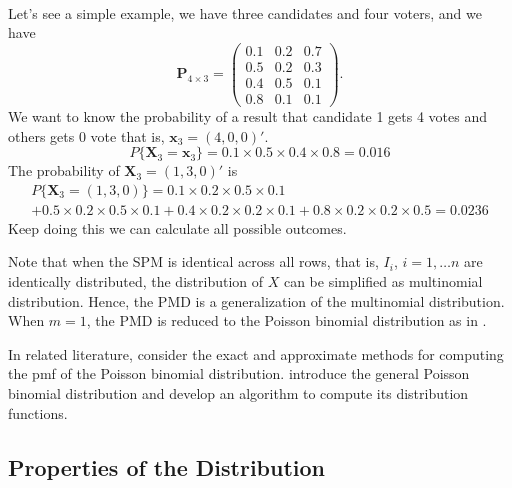 \documentclass[12pt]{article}
\newcommand{\Pmat}{\mathbf{P}}
\newcommand{\Xvec}{\boldsymbol{X}}
\newcommand{\xvec}{\boldsymbol{x}}
\begin{document}
\\
Let's see a simple example, we have three candidates and four voters, and we have
\begin{equation*}
\Pmat_{4 \times 3} = \begin{pmatrix}
0.1 &  0.2 & 0.7\\
0.5 & 0.2 & 0.3\\
0.4 &  0.5 & 0.1\\
0.8 & 0.1 & 0.1
\end{pmatrix}.
\end{equation*}
We want to know the probability of a result that candidate 1 gets 4 votes and others  gets 0 vote that is, $\xvec_3 =  (4,0,0)'$.
\begin{equation*}
P\{\Xvec_3 = \xvec_3\} = 0.1\times 0.5 \times 0.4 \times 0.8 = 0.016
\end{equation*}
The probability of $\Xvec_3=(1,3,0)'$ is
 \begin{multline*}
 P\{\Xvec_3 = (1,3,0)\} = 0.1\times 0.2 \times 0.5 \times 0.1\\ +
 0.5\times0.2\times0.5 \times 0.1 + 0.4\times0.2\times0.2\times0.1 + 0.8\times0.2\times0.2\times0.5 = 0.0236
 \end{multline*}
Keep doing this we can calculate all possible outcomes.


Note that when the SPM is identical across all rows, that is, $I_{i}$, $i = 1, \dots n$ are identically distributed, the distribution of $X$ can be simplified as multinomial distribution. Hence, the PMD is a generalization of the multinomial distribution. When $m=1$, the PMD is reduced to the Poisson binomial distribution as in .

In related literature,  consider the exact and approximate methods for computing the pmf of the Poisson binomial distribution.  introduce the general Poisson binomial distribution and develop an algorithm to compute its distribution functions.


\subsection{Properties of the Distribution}
\end{document}
